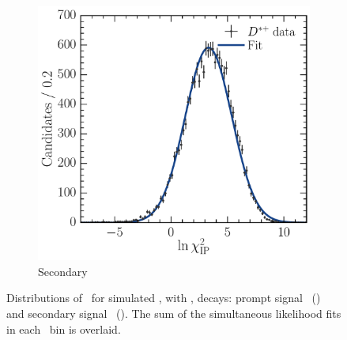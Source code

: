 \begin{figure}
\begin{subfigure}[b]{0.5\textwidth}
    \includegraphics[width=\textwidth]{figures/production/fitting/DstToD0pi_D0ToKpi_ipchisq_fit_pT_integrated_y_integrated_sec}
    \caption{Secondary}
    \label{fig:prod:fitting:prefits:DstToD0pi_D0ToKpi:secondary}
  \end{subfigure}
  \caption{%
    Distributions of \PDzero \lnipchisq\ for simulated \DstToDzpi, with 
    \DzToKpi, decays: prompt signal \PDstarp\
    () and secondary 
    signal \PDstarp\
    ().
    The sum of the simultaneous likelihood fits in each \pTy\ bin is overlaid.
  }
  \label{fig:prod:fitting:prefits:DstToD0pi_D0ToKpi}
\end{figure}

